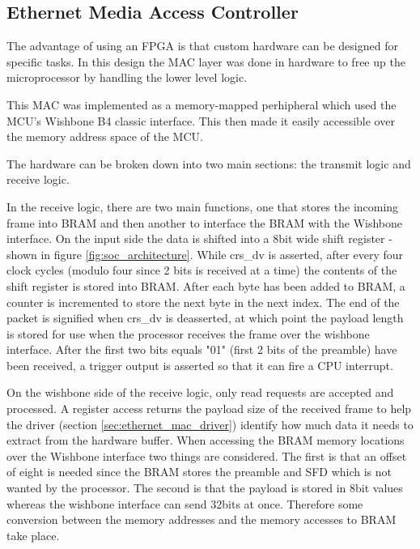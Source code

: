 \subsection{Ethernet Media Access Controller}
\label{sec:ethernet_mac}
The advantage of using an FPGA is that custom hardware can be designed for specific tasks. In this design the MAC layer was done in hardware to free up the microprocessor by handling the lower level logic. 

This MAC was implemented as a memory-mapped perhipheral which used the MCU's Wishbone B4 classic interface. This then made it easily accessible over the memory address space of the MCU.  



The hardware can be broken down into two main sections: the transmit logic and receive logic. 

In the receive logic, there are two main functions, one that stores the incoming frame into BRAM and then another to interface the BRAM with the Wishbone interface. On the input side the data is shifted into a 8bit wide shift register - shown in figure \ref{fig:soc_architecture}. While crs\_dv is asserted, after every four clock cycles (modulo four since 2 bits is received at a time) the contents of the shift register is stored into BRAM. After each byte has been added to BRAM, a counter is incremented to store the next byte in the next index. The end of the packet is signified when crs\_dv is deasserted, at which point the payload length is stored for use when the processor receives the frame over the wishbone interface. After the first two bits equals "01" (first 2 bits of the preamble) have been received, a trigger output is asserted so that it can fire a CPU interrupt.

On the wishbone side of the receive logic, only read requests are accepted and processed. A register access returns the payload size of the received frame to help the driver (section \ref{sec:ethernet_mac_driver}) identify how much data it needs to extract from the hardware buffer. When accessing the BRAM memory locations over the Wishbone interface two things are considered. The first is that an offset of eight is needed since the BRAM stores the preamble and SFD which is not wanted by the processor. The second is that the payload is stored in 8bit values whereas the wishbone interface can send 32bits at once. Therefore some conversion between the memory addresses and the memory accesses to BRAM take place. 

